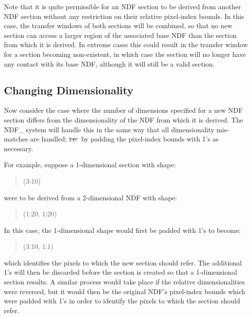 Note that it is quite permissible for an NDF section to be derived from
another NDF section without any restriction on their relative pixel-index
bounds. 
In this case, the transfer windows of both sections will be combined, so
that no new section can access a larger region of the associated base NDF
than the section from which it is derived. 
In extreme cases this could result in the transfer window for a section
becoming non-existent, in which case the section will no longer have any
contact with its base NDF, although it will still be a valid section. 

\subsection{\label{ss:changingdimensionality}Changing Dimensionality}

Now consider the case where the number of dimensions specified for a new NDF
section differs from the dimensionality of the NDF from which it is derived.
The NDF\_ system will handle this in the same way that all dimensionality
mis-matches are handled; \st{i.e.}\ by padding the pixel-index bounds with
1's as necessary. 

For example, suppose a 1-dimensional section with shape:

\small
\begin{quote}
\begin{center}
(3:10)
\end{center}
\end{quote}
\normalsize

were to be derived from a 2-dimensional NDF with shape:

\small
\begin{quote}
\begin{center}
(1:20, 1:20)
\end{center}
\end{quote}
\normalsize

In this case, the 1-dimensional shape would first be padded with 1's to 
become:

\small
\begin{quote}
\begin{center}
(3:10, 1:1)
\end{center}
\end{quote}
\normalsize

which identifies the pixels to which the new section should refer.
The additional 1's will then be discarded before the section is created so
that a 1-dimensional section results. 
A similar process would take place if the relative dimensionalities were
reversed, but it would then be the original NDF's pixel-index bounds which
were padded with 1's in order to identify the pixels to which the section
should refer. 

